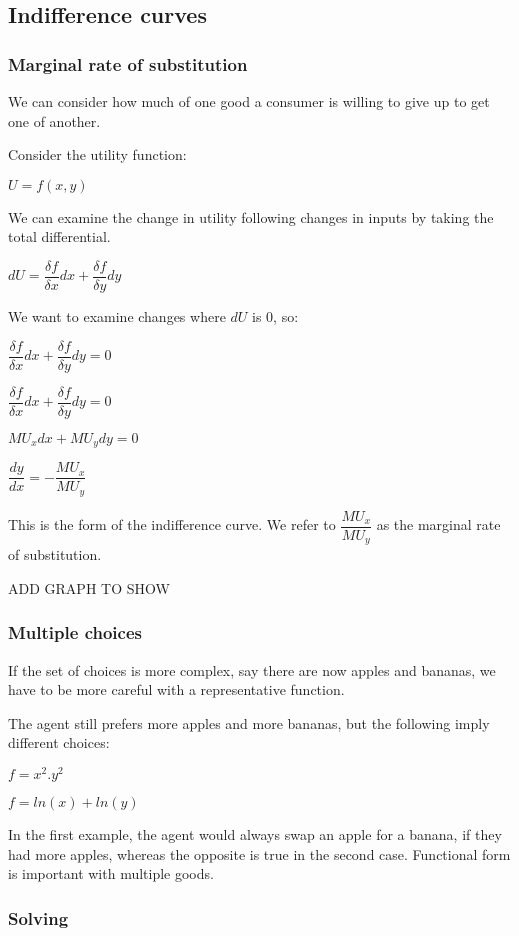 
\subsection{Indifference curves}

\subsubsection{Marginal rate of substitution}

We can consider how much of one good a consumer is willing to give up to get one of another.

Consider the utility function:

\(U=f(x,y)\)

We can examine the change in utility following changes in inputs by taking the total differential.

\(dU=\dfrac{\delta f}{\delta x}dx+\dfrac{\delta f}{\delta y}dy\)

We want to examine changes where \(dU\) is \(0\), so:

\( \dfrac{\delta f}{\delta x}dx+\dfrac{\delta f}{\delta y}dy=0\)

\( \dfrac{\delta f}{\delta x}dx+\dfrac{\delta f}{\delta y}dy=0\)

\( MU_xdx+MU_ydy=0\)

\( \dfrac{dy}{dx}=-\dfrac{MU_x}{MU_y}\)

This is the form of the indifference curve.  We refer to \(\dfrac{MU_x}{MU_y}\) as the marginal rate of substitution.

ADD GRAPH TO SHOW

\subsubsection{Multiple choices}

If the set of choices is more complex, say there are now apples and bananas, we have to be more careful with a representative function.

The agent still prefers more apples and more bananas, but the following imply different choices:

\(f=x^2.y^2\)

\(f=ln(x)+ln(y)\)

In the first example, the agent would always swap an apple for a banana, if they had more apples, whereas the opposite is true in the second case. Functional form is important with multiple goods.

\subsubsection{Solving}

